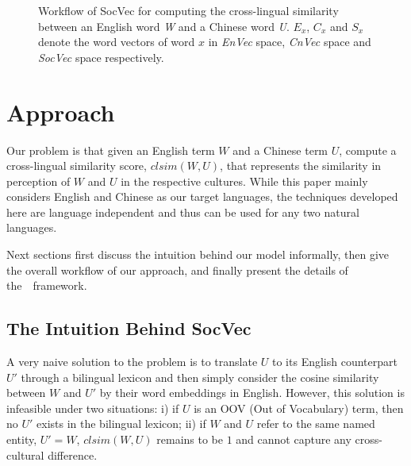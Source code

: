 \begin{figure}[th!]
\centering
{}
\caption{Workflow of SocVec for computing the cross-lingual similarity between an English word \textit{W} and a Chinese word \textit{U}. $E_x$, $C_x$ and $S_x$ denote the word vectors of word $x$ in \textit{EnVec} space, \textit{CnVec} space and \textit{SocVec} space respectively.  }
\label{fig:overview}
\end{figure}


\section{Approach}
\label{sec:socvec}

Our problem is that given an English term $W$ and a Chinese term $U$, compute a cross-lingual similarity score, $clsim(W, U)$, that represents the similarity in perception of $W$ and $U$ in the respective cultures. While this paper mainly considers English and Chinese as our target languages, the techniques developed here are language independent and thus can be used for any two natural languages.

 Next sections first discuss  the intuition behind our model informally, then give the overall workflow of our approach, and finally present the details of the~\textit{\socvec}~framework.

%
\subsection{The Intuition Behind SocVec}
A very naive solution to the problem is to translate $U$ to its English 
counterpart $U'$ through a bilingual lexicon and then simply consider 
the cosine similarity between $W$ and $U'$ by their word embeddings in English.
However, this solution is infeasible under two situations: 
i) if $U$ is an OOV (Out of Vocabulary) term,
then no $U'$ exists in the bilingual lexicon; 
ii) if $W$ and $U$ refer to the same named entity, $U' = W$, $clsim(W, U)$ remains to be $1$ and cannot capture any cross-cultural difference.

